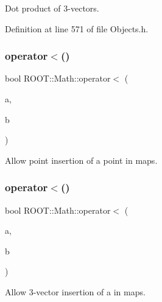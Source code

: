 Dot product of 3-\/vectors. 



Definition at line 571 of file Objects.\+h.

\hypertarget{namespace_r_o_o_t_1_1_math_ae526386c3fc57d159a6b9f227c859521}{}\label{namespace_r_o_o_t_1_1_math_ae526386c3fc57d159a6b9f227c859521} 
\subsubsection{\texorpdfstring{operator$<$()}{operator<()}\hspace{0.1cm}{\footnotesize\ttfamily [1/3]}}
{\footnotesize\ttfamily bool R\+O\+O\+T\+::\+Math\+::operator$<$ (\begin{DoxyParamCaption}\item[{const X\+Y\+Z\+Point \&}]{a,  }\item[{const X\+Y\+Z\+Point \&}]{b }\end{DoxyParamCaption})}



Allow point insertion of a point in maps. 

\hypertarget{namespace_r_o_o_t_1_1_math_a3bf72adbd1dc8071ef0283f0e253974a}{}\label{namespace_r_o_o_t_1_1_math_a3bf72adbd1dc8071ef0283f0e253974a} 
\subsubsection{\texorpdfstring{operator$<$()}{operator<()}\hspace{0.1cm}{\footnotesize\ttfamily [2/3]}}
{\footnotesize\ttfamily bool R\+O\+O\+T\+::\+Math\+::operator$<$ (\begin{DoxyParamCaption}\item[{const X\+Y\+Z\+Vector \&}]{a,  }\item[{const X\+Y\+Z\+Vector \&}]{b }\end{DoxyParamCaption})}



Allow 3-\/vector insertion of a in maps. 

\hypertarget{namespace_r_o_o_t_1_1_math_a1c3af6f88f23ab799472c3e6621364ea}{}\label{namespace_r_o_o_t_1_1_math_a1c3af6f88f23ab799472c3e6621364ea} 
